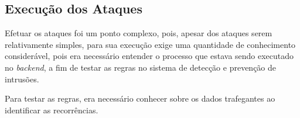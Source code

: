 		\subsection{Execução dos Ataques}
			Efetuar os ataques foi um ponto complexo, pois, apesar dos ataques serem relativamente simples, para sua execução exige
			uma quantidade de conhecimento considerável, pois era necessário entender o processo que
			estava sendo executado no \emph{backend}, a fim de testar as regras no sistema
			de detecção e prevenção de intrusões.

			Para testar as regras, era necessário conhecer sobre os dados trafegantes
			ao identificar as recorrências.
